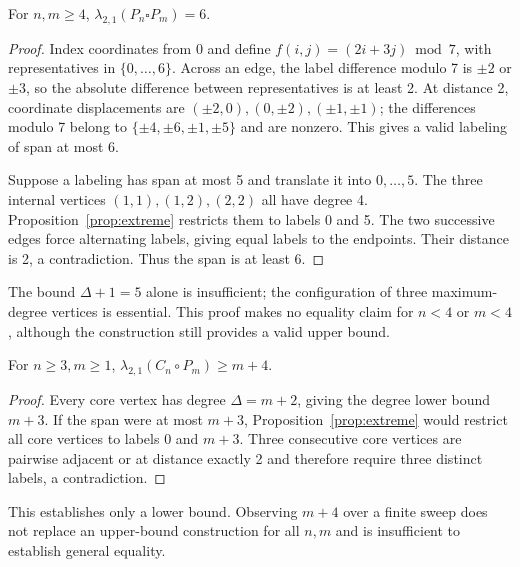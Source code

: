\begin{proposition}\label{prop:grid}
For $n,m\geq4$, $\lambda_{2,1}(P_n\square P_m)=6$.
\end{proposition}
\begin{proof}
Index coordinates from 0 and define $f(i,j)=(2i+3j)\bmod7$, with
representatives in $\{0,\ldots,6\}$. Across an edge, the label difference
modulo 7 is $\pm2$ or $\pm3$, so the absolute difference between
representatives is at least 2. At distance 2, coordinate displacements are
$(\pm2,0),(0,\pm2),(\pm1,\pm1)$; the differences modulo 7 belong to
$\{\pm4,\pm6,\pm1,\pm5\}$ and are nonzero. This gives a valid labeling
of span at most 6.

Suppose a labeling has span at most 5 and translate it into $0,\ldots,5$.
The three internal vertices $(1,1),(1,2),(2,2)$ all have degree 4.
Proposition~\ref{prop:extreme} restricts them to labels 0 and 5. The two
successive edges force alternating labels, giving equal labels to the
endpoints. Their distance is 2, a contradiction. Thus the span is at least 6.
\end{proof}
The bound $\Delta+1=5$ alone is insufficient; the configuration of three
maximum-degree vertices is essential. This proof makes no equality claim
for $n<4$ or $m<4$, although the construction still provides a valid upper bound.

\begin{proposition}\label{prop:corona-lower}
For $n\geq3,m\geq1$, $\lambda_{2,1}(C_n\circ P_m)\geq m+4$.
\end{proposition}
\begin{proof}
Every core vertex has degree $\Delta=m+2$, giving the degree lower bound
$m+3$. If the span were at most $m+3$, Proposition~\ref{prop:extreme}
would restrict all core vertices to labels 0 and $m+3$. Three consecutive
core vertices are pairwise adjacent or at distance exactly 2 and therefore
require three distinct labels, a contradiction.
\end{proof}
This establishes only a lower bound. Observing $m+4$ over a finite sweep
does not replace an upper-bound construction for all $n,m$ and is
insufficient to establish general equality.
